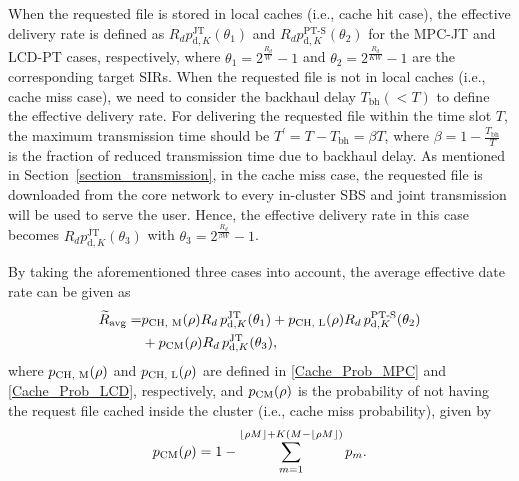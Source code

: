 \documentclass[twocolumns,10pt]{IEEEtran}
\begin{document}
When the requested file is stored in local caches (i.e., cache hit case), the effective delivery rate is defined as
$R_d p_{\text{d},K}^{\text{JT}} (\theta_1)$ and $R_d p_{\text{d},K}^{\text{PT-S}} (\theta_2)$
for the MPC-JT and LCD-PT cases, respectively, where $\theta_1=2^{\frac{R_d}{W}}-1$ and $\theta_2=2^{\frac{R_d}{KW}}-1$ are the corresponding target SIRs.
When the requested file is not in local caches (i.e., cache miss case), we need to consider the backhaul delay $T_{\text{bh}} (<T)$ to define the effective delivery rate. 
For delivering the requested file within the time slot $T$,
the maximum transmission time should be $T^{'}=T-T_{\text{bh}}=\beta T$, 
where $\beta=1-\frac{T_{\text{bh}}}{T}$ is the fraction of reduced transmission time due to backhaul delay. As mentioned in Section~\ref{section_transmission}, in the cache miss case, the requested file is downloaded from the core network to every in-cluster SBS and joint transmission will be used to serve the user. 
Hence, the effective delivery rate in this case becomes $R_d p_{\text{d},K}^{\text{JT}} (\theta_3)$ with $\theta_3=2^{\frac{R_d}{\beta W}}-1$.



By taking the aforementioned three cases into account, the average effective date rate can be given as
\begin{equation}\label{Effective_Rate}
\begin{split}
\widetilde{R}_{\textnormal{avg}}= & p_{\textnormal{CH, M}}(\rho) R_d \, p_{\text{d},K}^{\text{JT}} (\theta_1)+ p_{\textnormal{CH, L}}(\rho) R_d \,  p_{\text{d},K}^{\text{PT-S}}(\theta_2) \\
 &+p_{\textnormal{CM}}(\rho) R_d \,  p_{\text{d},K}^{\text{JT}}(\theta_3),
\end{split}
\end{equation}
where $p_{\textnormal{CH, M}}(\rho)$ and $p_{\textnormal{CH, L}}(\rho)$ are defined in \eqref{Cache_Prob_MPC} and \eqref{Cache_Prob_LCD}, respectively,
and $p_{\textnormal{CM}}(\rho)$ is the probability of not having the request file cached inside the cluster (i.e., cache miss probability), given by
\begin{align}	
	p_{\textnormal{CM}} (\rho)=1-\sum\limits_{m=1}^{\lfloor \rho M\rfloor+K(M-\lfloor \rho M\rfloor)} p_{m}.
	\label{Cache_Prob_MISS}
\end{align}
\end{document}
